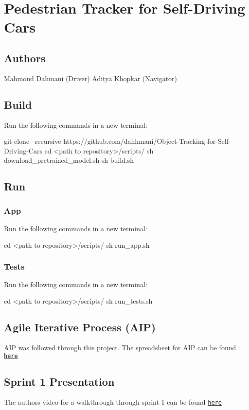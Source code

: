 \href{https://opensource.org/licenses/MIT}{\tt } \section*{Pedestrian Tracker for Self-\/\+Driving Cars}

\subsection*{Authors}

Mahmoud Dahmani (Driver) Aditya Khopkar (Navigator)

\subsection*{Build}

Run the following commands in a new terminal\+: 
\begin{DoxyCode}
git clone --recursive https://github.com/dahhmani/Object-Tracking-for-Self-Driving-Cars
cd <path to repository>/scripts/
sh download\_pretrained\_model.sh
sh build.sh
\end{DoxyCode}


\subsection*{Run}

\subsubsection*{App}

Run the following commands in a new terminal\+: 
\begin{DoxyCode}
cd <path to repository>/scripts/
sh run\_app.sh
\end{DoxyCode}


\subsubsection*{Tests}

Run the following commands in a new terminal\+: 
\begin{DoxyCode}
cd <path to repository>/scripts/
sh run\_tests.sh
\end{DoxyCode}


\subsection*{Agile Iterative Process (A\+IP)}

A\+IP was followed through this project. The spreadsheet for A\+IP can be found \href{https://docs.google.com/spreadsheets/d/1BaOfv9Mm0KZr2UOX5iRpPzrG3YCumrxETiyOKJdlnB4/edit?usp=sharing}{\tt here}

\subsection*{Sprint 1 Presentation}

The authors\textquotesingle{} video for a walkthrough through sprint 1 can be found \href{https://drive.google.com/drive/folders/1pAYf5VVa0utqFDkQDwOQhmljQUaqd09Y?usp=sharing}{\tt here} 